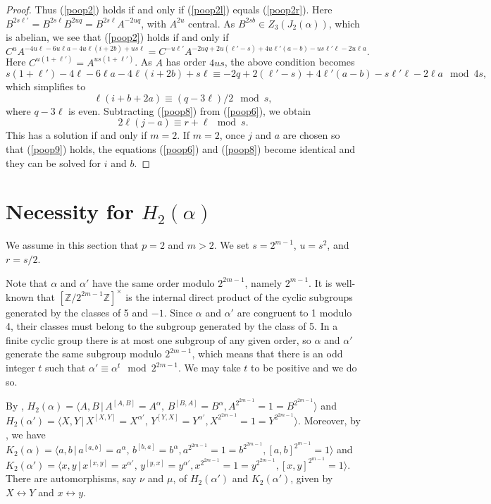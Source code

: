\documentclass{amsart}
\theoremstyle{definition}
\theoremstyle{remark}
\newcommand \Z{{\mathbb Z}}
\begin{document}
\begin{proof}
Thus (\ref{poop2}) holds if and only if (\ref{poop2l}) equals (\ref{poop2r}).
Here $B^{2s\ell'}=B^{2s\ell}B^{2uq}=B^{2s\ell}A^{-2uq}$, with $A^{2u}$ central.  As $B^{2sb}\in Z_3(J_2(\alpha))$,
which is abelian, we see that (\ref{poop2}) holds if and only if
$$
C^u A^{-4u\ell-6u\ell a-4u\ell(i+2b)+us\ell}=C^{-u\ell'}A^{-2uq+2u(\ell'-s)+4u\ell'(a-b)-us\ell'\ell-2u\ell a}.
$$
Here $C^{u(1+\ell')}=A^{us(1+\ell')}$. As $A$ has order $4us$, the above condition becomes
$$
s(1+\ell')-4\ell-6\ell a-4\ell(i+2b)+s\ell\equiv -2q+2(\ell'-s)+4\ell'(a-b)-s\ell'\ell-2\ell a\mod 4s,
$$
which simplifies to
\begin{equation}
    \label{poop8}
\ell(i+b+2a)\equiv (q-3\ell)/2\mod s,
\end{equation}
where $q-3\ell$ is even. Subtracting (\ref{poop8}) from (\ref{poop6}), we obtain
\begin{equation}
    \label{poop9}
2\ell(j-a)\equiv r+\ell\mod s.
\end{equation}
This has a solution if and only if $m=2$.  If $m=2$, once $j$ and $a$ are chosen so that (\ref{poop9}) holds,
the equations (\ref{poop6}) and (\ref{poop8}) become identical and they can be solved for $i$ and $b$.
\end{proof}


\section{Necessity for $H_2(\alpha)$}\label{necfh2}

We assume in this section that $p=2$ and $m>2$. We set $s=2^{m-1}$, $u=s^2$, and $r=s/2$.

Note that $\alpha$ and $\alpha'$ have the same order modulo $2^{2m-1}$, namely $2^{m-1}$. It is
well-known that $[\Z/2^{2m-1}\Z]^\times$ is the internal direct product of the cyclic subgroups generated by
the classes of 5 and $-1$. Since $\alpha$ and $\alpha'$ are congruent to 1 modulo 4, their classes must belong
to the subgroup generated by the class of 5. In a finite cyclic group there is at most one subgroup of any given order,
so $\alpha$ and $\alpha'$ generate the same subgroup modulo $2^{2m-1}$, which means that there is an odd integer $t$
such that $\alpha'\equiv\alpha^t\mod 2^{2m-1}$. We may take $t$ to be positive and we do so.

By \cite[Section 6]{MS3},
$
H_2(\alpha)=\langle A,B\,|\, A^{[A,B]}=A^{\alpha},\, B^{[B,A]}=B^{\alpha},  A^{2^{2m-1}}=1=B^{2^{2m-1}}\rangle
$
and
$
H_2(\alpha')=\langle X,Y\,|\, X^{[X,Y]}=X^{\alpha'},\, Y^{[Y,X]}=Y^{\alpha'},  X^{2^{2m-1}}=1=Y^{2^{2m-1}}\rangle.
$
Moreover, by \cite[Section 5]{MS3}, we have
$
K_2(\alpha)=\langle a,b\,|\, a^{[a,b]}=a^\alpha,\, b^{[b,a]}=b^\alpha, a^{2^{2m-1}}=1=b^{2^{2m-1}}, [a,b]^{2^{m-1}}=1\rangle
$
and
$
K_2(\alpha')=\langle x,y\,|\, x^{[x,y]}=x^{\alpha'},\, y^{[y,x]}=y^{\alpha'},  x^{2^{2m-1}}=1=y^{2^{2m-1}},[x,y]^{2^{m-1}}=1\rangle.
$
There are automorphisms, say $\nu$ and $\mu$, of $H_2(\alpha')$ and $K_2(\alpha')$, given by $X\leftrightarrow Y$
and $x\leftrightarrow y$.
\end{document}
